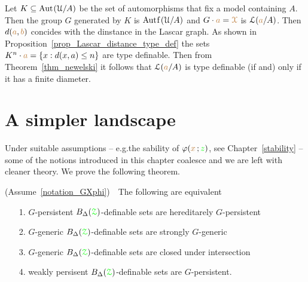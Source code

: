 

\begin{example}\label{ex_newelski}
  Let $K\subseteq{\rm Aut\kern.15ex}(\EuScript U/A)$ be the set of automorphisms that fix a model containing $A$.
  Then the group $G$  generated by $K$ is $\mathord{\rm Aut\kern.15ex{f}\kern.15ex}(\EuScript U/A)$ and $G\cdot{\color{brown}a}={\color{brown}\EuScript X}$ is $\EuScript L({\color{brown} a}/A)$.
  Then $d({\color{brown} a},{\color{brown} b})$ concides with the dinstance in the Lascar graph.
  As shown in Proposition~\ref{prop_Lascar_distance_type_def} the sets $K^n\cdot{\color{brown}a}=\{x:d(x,a)\le n\}$ are type definable.
  Then from Theorem~\ref{thm_newelski} it follows that $\EuScript L({\color{brown} a}/A)$ is type definable (if and) only if it has a finite diameter.
\end{example} 

\section{A simpler landscape}

Under suitable assumptions -- e.g.\@ the sability of $\varphi({\color{brown} x}\,;{\color{green} z})$, see Chapter~\ref{stability} -- some of the notions introduced in this chapter coalesce and we are left with cleaner theory.
We prove the following theorem.

\begin{theorem}\label{thm_coalesce}
  (Assume~\ref{notation_GXphi})\ \  
  The following are equivalent
  \begin{itemize}
    \item[1.] $G$-persistent $B_\Delta({{\color{green}\EuScript Z}})$-definable sets are hereditarely $G$-persistent
    \item[2.] $G$-generic $B_\Delta({{\color{green}\EuScript Z}})$-definable sets are strongly $G$-generic
    \item[3.] $G$-generic $B_\Delta({{\color{green}\EuScript Z}})$-definable sets are closed under intersection
    \item[4.] weakly persisent $B_\Delta({{\color{green}\EuScript Z}})$-definable sets are $G$-persistent.
  \end{itemize}
\end{theorem}

